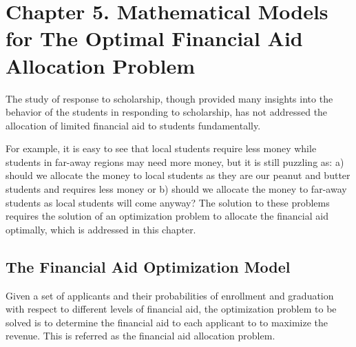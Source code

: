 \documentclass[12pt,english]{report}
\begin{document}

\chapter{Chapter 5. Mathematical Models for The Optimal Financial Aid  Allocation Problem }
The study of response to scholarship, though provided many insights into the behavior of the students in responding to scholarship, has not addressed the allocation of limited financial aid to students fundamentally.

For example, it is easy to see that local students require less money while students in far-away regions may need more money,  but it is still puzzling as: a) should we allocate the money to local students as they are our peanut and butter students and requires less money or b) should we allocate the money to far-away students as local students will come anyway? The solution to these problems requires the solution of an optimization problem to allocate the financial aid optimally, which is addressed in this chapter.

\section{The Financial Aid Optimization Model}
Given a set of applicants and their probabilities of enrollment and graduation with respect to different levels of financial aid, the optimization problem to be solved is to determine the financial aid to each applicant to to maximize the revenue. This is referred as the financial aid allocation problem.
\end{document}
